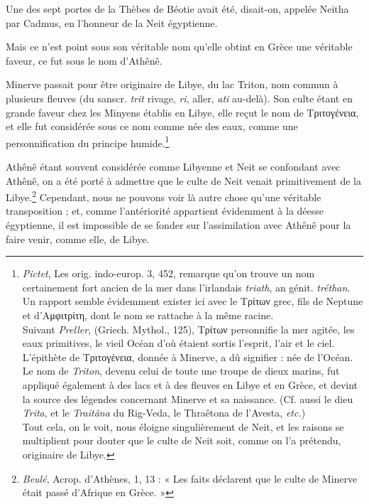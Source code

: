 \documentclass[a4paper, 11pt, oneside]{article}
\begin{document}
Une des sept portes de la Thèbes de Béotie avait été, disait-on, appelée Neitha par Cadmus, en l'honneur de la Neit égyptienne.

Mais ce n'est point sous son véritable nom qu'elle obtint en Grèce une véritable faveur, ce fut sous le nom d'Athênê.

Minerve passait pour être originaire de Libye, du lac Triton, nom commun à plusieurs fleuves (du sanscr. \emph{trit} rivage, \emph{ri}, aller, \emph{ati} au-delà). Son culte étant en grande faveur chez les Minyens établis en Libye, elle reçut le nom de Τριτογένεια, et elle fut considérée sous ce nom comme née des eaux, comme une personnification du principe humide.\footnote{\emph{Pictet}, Les orig. indo-europ. 3, 452, remarque qu'on trouve un nom certainement fort ancien de la mer dans l'irlandais \emph{triath}, an génit. \emph{tréthan}. Un rapport semble évidemment exister ici avec le Τρίτων grec, fils de Neptune et d'Αμφιτρίτη, dont le nom se rattache à la même racine.\\\hspace*{5mm}Suivant \emph{Preller}, (Griech. Mythol., 125), Τρίτων personnifie la mer agitée, les eaux primitives, le vieil Océan d'où étaient sortis l'esprit, l'air et le ciel. L'épithète de Τριτογένεια, donnée à Minerve, a dû signifier : née de l'Océan. Le nom de \emph{Triton}, devenu celui de toute une troupe de dieux marins, fut appliqué également à des lacs et à des fleuves en Libye et en Grèce, et devint la source des légendes concernant Minerve et sa naissance. (Cf. aussi le dieu \emph{Trita}, et le \emph{Traitâna} du Rig-Veda, le Thraêtona de l'Avesta, \emph{etc.})\\\hspace*{5mm}Tout cela, on le voit, nous éloigne singulièrement de Neit, et les raisons se multiplient pour douter que le culte de Neit soit, comme on l'a prétendu, originaire de Libye.}

Athênê étant souvent considérée comme Libyenne et Neit se confondant avec Athênê, on a été porté à admettre que le culte de Neit venait primitivement de la Libye.\footnote{\emph{Beulé}, Acrop. d'Athènes, 1, 13 : « Les faits déclarent que le culte de Minerve était passé d'Afrique en Grèce. »} Cependant, nous ne pouvons voir là autre chose qu'une véritable transposition ; et, comme l'antériorité appartient évidemment à la déesse égyptienne, il est impossible de se fonder sur l'assimilation avec Athênê pour la faire venir, comme elle, de Libye.
\end{document}
